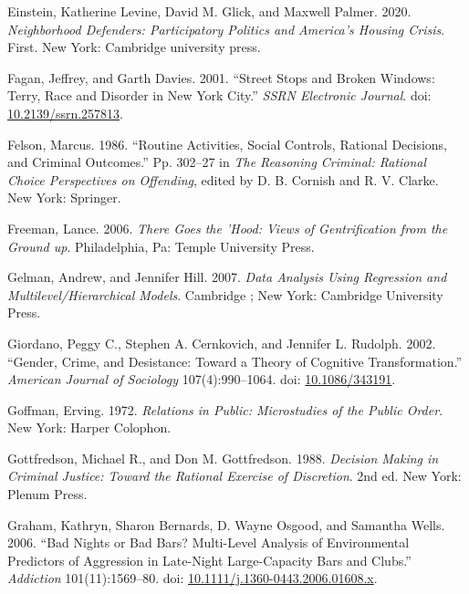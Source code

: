 \documentclass [11pt, proquest] {uwthesis}[2015/03/03]
\newlength{\cslhangindent}
\newenvironment{CSLReferences}[2]%
{\setlength{\parindent}{0pt}%
\everypar{\setlength{\hangindent}{\cslhangindent}}\ignorespaces}%
{\par}
\begin{document}
\begin{CSLReferences}{1}{0}
\leavevmode\hypertarget{ref-einsteinNeighborhoodDefendersParticipatory2020}{}%
Einstein, Katherine Levine, David M. Glick, and Maxwell Palmer. 2020. \emph{Neighborhood {Defenders}: {Participatory Politics} and {America}'s {Housing Crisis}}. First. {New York}: {Cambridge university press}.

\leavevmode\hypertarget{ref-faganStreetStopsBroken2001}{}%
Fagan, Jeffrey, and Garth Davies. 2001. {``Street {Stops} and {Broken Windows}: {Terry}, {Race} and {Disorder} in {New York City}.''} \emph{SSRN Electronic Journal}. doi: \href{https://doi.org/10.2139/ssrn.257813}{10.2139/ssrn.257813}.

\leavevmode\hypertarget{ref-felsonRoutineActivitiesSocial1986}{}%
Felson, Marcus. 1986. {``Routine Activities, Social Controls, Rational Decisions, and Criminal Outcomes.''} Pp. 302--27 in \emph{The {Reasoning Criminal}: {Rational Choice Perspectives} on {Offending}}, edited by D. B. Cornish and R. V. Clarke. {New York}: {Springer}.

\leavevmode\hypertarget{ref-freemanThereGoesHood2006}{}%
Freeman, Lance. 2006. \emph{There Goes the 'Hood: Views of Gentrification from the Ground up}. {Philadelphia, Pa}: {Temple University Press}.

\leavevmode\hypertarget{ref-gelmanDataAnalysisUsing2007}{}%
Gelman, Andrew, and Jennifer Hill. 2007. \emph{Data {Analysis Using Regression} and {Multilevel}/{Hierarchical Models}}. {Cambridge ; New York}: {Cambridge University Press}.

\leavevmode\hypertarget{ref-giordanoGenderCrimeDesistance2002}{}%
Giordano, Peggy C., Stephen A. Cernkovich, and Jennifer L. Rudolph. 2002. {``Gender, {Crime}, and {Desistance}: {Toward} a {Theory} of {Cognitive Transformation}.''} \emph{American Journal of Sociology} 107(4):990--1064. doi: \href{https://doi.org/10.1086/343191}{10.1086/343191}.

\leavevmode\hypertarget{ref-goffmanRelationsPublicMicrostudies1972}{}%
Goffman, Erving. 1972. \emph{Relations in {Public}: {Microstudies} of the {Public Order}}. {New York}: {Harper Colophon}.

\leavevmode\hypertarget{ref-gottfredsonDecisionMakingCriminal1988}{}%
Gottfredson, Michael R., and Don M. Gottfredson. 1988. \emph{Decision Making in Criminal Justice: Toward the Rational Exercise of Discretion}. 2nd ed. {New York}: {Plenum Press}.

\leavevmode\hypertarget{ref-grahamBadNightsBad2006}{}%
Graham, Kathryn, Sharon Bernards, D. Wayne Osgood, and Samantha Wells. 2006. {``Bad Nights or Bad Bars? {Multi}-Level Analysis of Environmental Predictors of Aggression in Late-Night Large-Capacity Bars and Clubs.''} \emph{Addiction} 101(11):1569--80. doi: \href{https://doi.org/10.1111/j.1360-0443.2006.01608.x}{10.1111/j.1360-0443.2006.01608.x}.


\end{CSLReferences}
\end{document}
